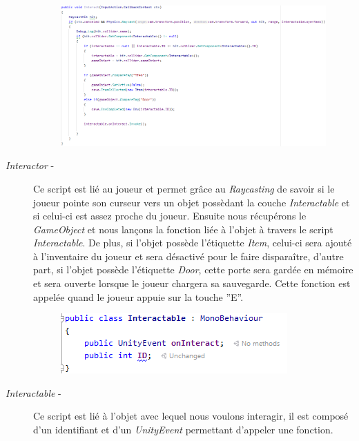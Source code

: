 \begin{description}
    \begin{figure}[H]
\centering
\begin{minipage}{.5\textwidth}
  \centering
  \centerline{\includegraphics[width=2.25\linewidth]{img/gameplay/interactor.PNG}}
  \label{fig:octobercrowfont}
\end{minipage}%
\end{figure}
    \item[\emph{Interactor} -] Ce script est lié au joueur et permet grâce au \emph{Raycasting} de savoir si le joueur pointe son curseur vers un objet possèdant la couche \emph{Interactable} et si celui-ci est assez proche du joueur. Ensuite nous récupérons le \emph{GameObject} et nous lançons la fonction liée à l’objet à travers le script \emph{Interactable}. De plus, si l’objet possède l'étiquette \emph{Item}, celui-ci sera ajouté à l’inventaire du joueur et sera désactivé pour le faire disparaître, d’autre part, si l’objet possède l'étiquette \emph{Door}, cette porte sera gardée en mémoire et sera ouverte lorsque le joueur chargera sa sauvegarde. Cette fonction est appelée quand le joueur appuie sur la touche ''E''.
\begin{figure}[H]
\centering
\begin{minipage}{.5\textwidth}
  \centering
  \centerline{\includegraphics[width=1.5\linewidth]{img/gameplay/interactable.PNG}}
  \label{fig:octobercrowfont}
\end{minipage}%
\end{figure}
    \item[\emph{Interactable} -] Ce script est lié à l’objet avec lequel nous voulons interagir, il est composé d’un identifiant et d’un \emph{UnityEvent} permettant d’appeler une fonction.
\end{description}

